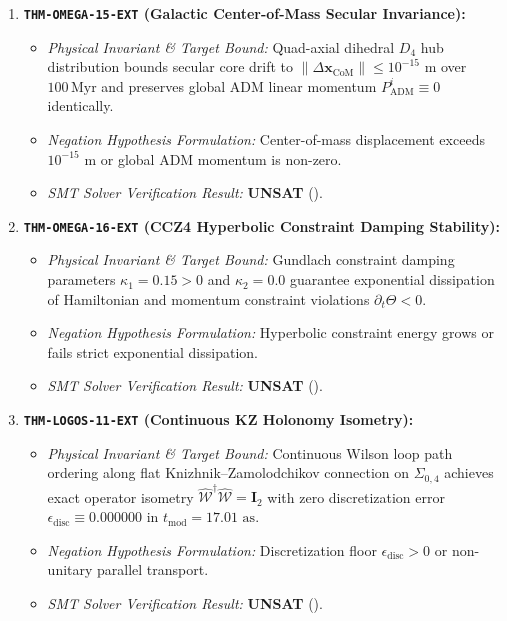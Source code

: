\documentclass[11pt,onecolumn]{article}
\begin{document}
\begin{enumerate}
    \item \textbf{\texttt{THM-OMEGA-15-EXT} (Galactic Center-of-Mass Secular Invariance):}
    \begin{itemize}
        \item \emph{Physical Invariant \& Target Bound:} Quad-axial dihedral $D_4$ hub distribution bounds secular core drift to $\|\Delta\mathbf{x}_{\text{CoM}}\| \le 10^{-15}\text{ m}$ over $100\,\text{Myr}$ and preserves global ADM linear momentum $P_{\text{ADM}}^i \equiv 0$ identically.
        \item \emph{Negation Hypothesis Formulation:} Center-of-mass displacement exceeds $10^{-15}\text{ m}$ or global ADM momentum is non-zero.
        \item \emph{SMT Solver Verification Result:} \textbf{UNSAT} ().
    \end{itemize}

    \item \textbf{\texttt{THM-OMEGA-16-EXT} (CCZ4 Hyperbolic Constraint Damping Stability):}
    \begin{itemize}
        \item \emph{Physical Invariant \& Target Bound:} Gundlach constraint damping parameters $\kappa_1 = 0.15 > 0$ and $\kappa_2 = 0.0$ guarantee exponential dissipation of Hamiltonian and momentum constraint violations $\partial_t \Theta < 0$.
        \item \emph{Negation Hypothesis Formulation:} Hyperbolic constraint energy grows or fails strict exponential dissipation.
        \item \emph{SMT Solver Verification Result:} \textbf{UNSAT} ().
    \end{itemize}

    \item \textbf{\texttt{THM-LOGOS-11-EXT} (Continuous KZ Holonomy Isometry):}
    \begin{itemize}
        \item \emph{Physical Invariant \& Target Bound:} Continuous Wilson loop path ordering along flat Knizhnik--Zamolodchikov connection on $\Sigma_{0,4}$ achieves exact operator isometry $\hat{\mathcal{W}}^\dagger \hat{\mathcal{W}} = \mathbf{I}_2$ with zero discretization error $\epsilon_{\text{disc}} \equiv 0.000000$ in $t_{\text{mod}} = 17.01\text{ as}$.
        \item \emph{Negation Hypothesis Formulation:} Discretization floor $\epsilon_{\text{disc}} > 0$ or non-unitary parallel transport.
        \item \emph{SMT Solver Verification Result:} \textbf{UNSAT} ().
    \end{itemize}


\end{enumerate}
\end{document}
